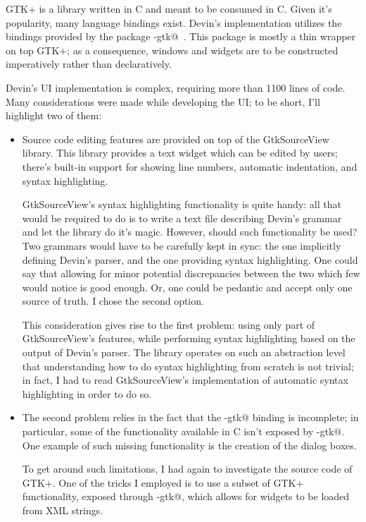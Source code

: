 \documentclass[UdineBachThesis,american,11pt]{PhdThesis}
\begin{document}
  GTK+ is a library written in C and meant to be consumed in C. Given it's
  popularity, many language bindings exist. Devin's implementation utilizes the
  bindings provided by the package \lstinline@gi-gtk@~\cite{gi-gtk}. This
  package is mostly a thin wrapper on top GTK+; as a consequence, windows and
  widgets are to be constructed imperatively rather than declaratively.

  Devin's UI implementation is complex, requiring more than 1100 lines of code.
  Many considerations were made while developing the UI; to be short, I'll
  highlight two of them:

  \begin{itemize}
    \item Source code editing features are provided on top of the GtkSourceView
    library. This library provides a text widget which can be edited by users;
    there's built-in support for showing line numbers, automatic indentation,
    and syntax highlighting.

    \newpage

    GtkSourceView's syntax highlighting functionality is quite handy: all that
    would be required to do is to write a text file describing Devin's grammar
    and let the library do it's magic. However, should such functionality be
    used? Two grammars would have to be carefully kept in sync: the one
    implicitly defining Devin's parser, and the one providing syntax
    highlighting. One could say that allowing for minor potential discrepancies
    between the two which few would notice is good enough. Or, one could be
    pedantic and accept only one source of truth. I chose the second option.

    This consideration gives rise to the first problem: using only part of
    GtkSourceView's features, while performing syntax highlighting based on the
    output of Devin's parser. The library operates on such an abstraction level
    that understanding how to do syntax highlighting from scratch is not
    trivial; in fact, I had to read GtkSourceView's implementation of automatic
    syntax highlighting in order to do so.

    \item The second problem relies in the fact that the \lstinline@gi-gtk@
     binding is incomplete; in particular, some of the functionality available
     in C isn't exposed by \lstinline@gi-gtk@. One example of such missing
     functionality is the creation of the dialog boxes.

    To get around such limitations, I had again to investigate the source code
    of GTK+. One of the tricks I employed is to use a subset of GTK+
    functionality, exposed through \lstinline@gi-gtk@, which allows for widgets
    to be loaded from XML strings.
  \end{itemize}
\end{document}
